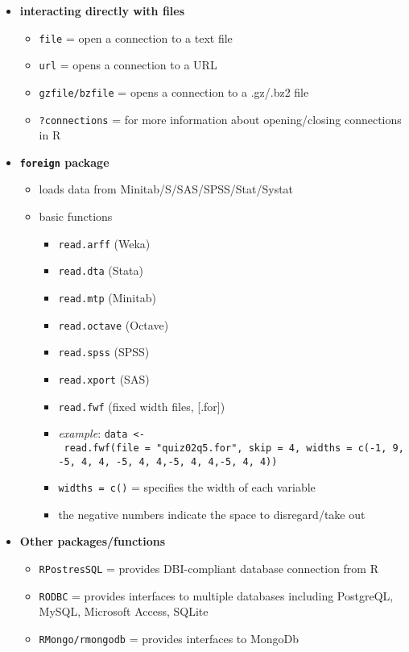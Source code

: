 \documentclass[
]{article}
\providecommand{\tightlist}{%
  \setlength{\itemsep}{0pt}\setlength{\parskip}{0pt}}
\begin{document}
\begin{itemize}
\tightlist
\item
  \textbf{interacting directly with files}

  \begin{itemize}
  \tightlist
  \item
    \texttt{file} = open a connection to a text file
  \item
    \texttt{url} = opens a connection to a URL
  \item
    \texttt{gzfile/bzfile} = opens a connection to a .gz/.bz2 file
  \item
    \texttt{?connections} = for more information about opening/closing
    connections in R
  \end{itemize}
\item
  \textbf{\texttt{foreign} package}

  \begin{itemize}
  \tightlist
  \item
    loads data from Minitab/S/SAS/SPSS/Stat/Systat
  \item
    basic functions

    \begin{itemize}
    \tightlist
    \item
      \texttt{read.arff} (Weka)
    \item
      \texttt{read.dta} (Stata)
    \item
      \texttt{read.mtp} (Minitab)
    \item
      \texttt{read.octave} (Octave)
    \item
      \texttt{read.spss} (SPSS)
    \item
      \texttt{read.xport} (SAS)
    \item
      \texttt{read.fwf} (fixed width files, {[}.for{]})
    \item
      \emph{example}:
      \texttt{data\ \textless{}-\ read.fwf(file\ =\ "quiz02q5.for",\ skip\ =\ 4,\ widths\ =\ c(-1,\ 9,-5,\ 4,\ 4,\ -5,\ 4,\ 4,-5,\ 4,\ 4,-5,\ 4,\ 4))}
    \item
      \texttt{widths\ =\ c()} = specifies the width of each variable
    \item
      the negative numbers indicate the space to disregard/take out
    \end{itemize}
  \end{itemize}
\item
  \textbf{Other packages/functions}

  \begin{itemize}
  \tightlist
  \item
    \texttt{RPostresSQL} = provides DBI-compliant database connection
    from R
  \item
    \texttt{RODBC} = provides interfaces to multiple databases including
    PostgreQL, MySQL, Microsoft Access, SQLite
  \item
    \texttt{RMongo/rmongodb} = provides interfaces to MongoDb


\end{itemize}
\end{itemize}
\end{document}

